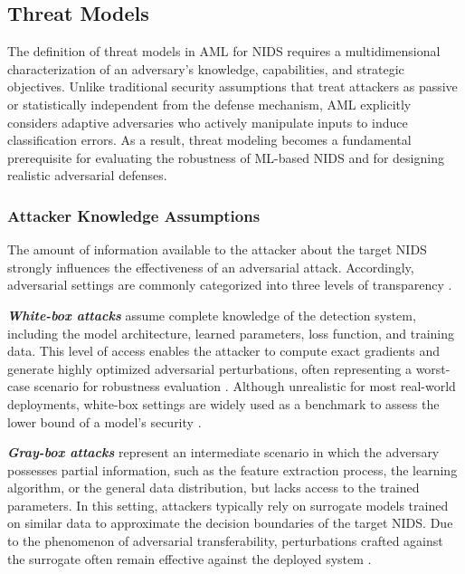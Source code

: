 \subsection{Threat Models}

The definition of threat models in AML for NIDS requires a multidimensional characterization of an adversary's knowledge, capabilities, and strategic objectives. Unlike traditional security assumptions that treat attackers as passive or statistically independent from the defense mechanism, AML explicitly considers adaptive adversaries who actively manipulate inputs to induce classification errors. As a result, threat modeling becomes a fundamental prerequisite for evaluating the robustness of ML-based NIDS and for designing realistic adversarial defenses.

\subsubsection{Attacker Knowledge Assumptions}

The amount of information available to the attacker about the target NIDS strongly influences the effectiveness of an adversarial attack. 
Accordingly, adversarial settings are commonly categorized into three levels of transparency \cite{ayub2020model}.

\textit{\textbf{White-box attacks}} assume complete knowledge of the detection system, including the model architecture, learned parameters, loss function, and training data. This level of access enables the attacker to compute exact gradients and generate highly optimized adversarial perturbations, often representing a worst-case scenario for robustness evaluation \cite{yuan2024simple, abou2020evaluation}. Although unrealistic for most real-world deployments, white-box settings are widely used as a benchmark to assess the lower bound of a model's security \cite{ayub2020model}.

\textit{\textbf{Gray-box attacks}} represent an intermediate scenario in which the adversary possesses partial information, such as the feature extraction process, the learning algorithm, or the general data distribution, but lacks access to the trained parameters. In this setting, attackers typically rely on surrogate models trained on similar data to approximate the decision boundaries of the target NIDS. Due to the phenomenon of adversarial transferability, perturbations crafted against the surrogate often remain effective against the deployed system \cite{zhang2022adversarial, khorshidpour2018domain, vitorino2025reliable}.

